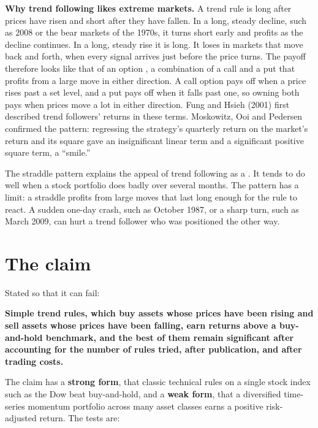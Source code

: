 \textbf{Why trend following likes extreme markets.} A trend rule is long after prices have risen and short after they have fallen. In a long, steady decline, such as 2008 or the bear markets of the 1970s, it turns short early and profits as the decline continues. In a long, steady rise it is long. It loses in markets that move back and forth, when every signal arrives just before the price turns. The payoff therefore looks like that of an option , a combination of a call and a put that profits from a large move in either direction. A call option pays off when a price rises past a set level, and a put pays off when it falls past one, so owning both pays when prices move a lot in either direction. Fung and Hsieh (2001) first described trend followers' returns in these terms. Moskowitz, Ooi and Pedersen confirmed the pattern: regressing the strategy's quarterly return on the market's return and its square gave an insignificant linear term and a significant positive square term, a ``smile.''

The straddle pattern explains the appeal of trend following as a . It tends to do well when a stock portfolio does badly over several months. The pattern has a limit: a straddle profits from large moves that last long enough for the rule to react. A sudden one-day crash, such as October 1987, or a sharp turn, such as March 2009, can hurt a trend follower who was positioned the other way.


\section{The claim}
\label{sec:08-claim}

Stated so that it can fail:

\begin{callout}
\textbf{Simple trend rules, which buy assets whose prices have been rising and sell assets whose prices have been falling, earn returns above a buy-and-hold benchmark, and the best of them remain significant after accounting for the number of rules tried, after publication, and after trading costs.}
\end{callout}

The claim has a \textbf{strong form}, that classic technical rules on a single stock index such as the Dow beat buy-and-hold, and a \textbf{weak form}, that a diversified time-series momentum portfolio across many asset classes earns a positive risk-adjusted return. The tests are:


